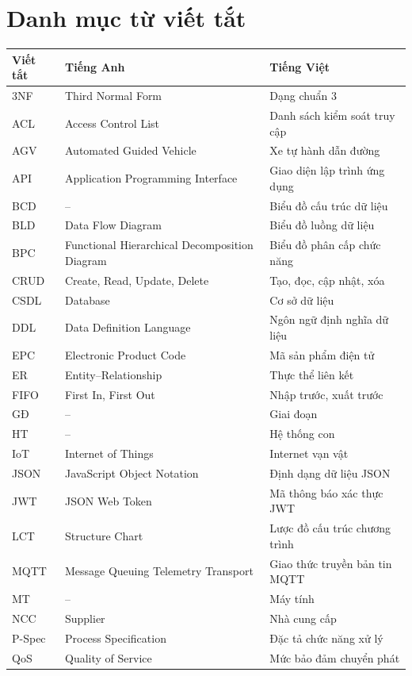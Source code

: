 \chapter*{Danh mục từ viết tắt}
{\small
\begin{longtable}{L{1.9cm} L{6.2cm} p{6.2cm}}
\toprule
\textbf{Viết tắt} & \textbf{Tiếng Anh} & \textbf{Tiếng Việt} \\
\midrule
\endhead
3NF & Third Normal Form & Dạng chuẩn 3 \\
ACL & Access Control List & Danh sách kiểm soát truy cập \\
AGV & Automated Guided Vehicle & Xe tự hành dẫn đường \\
API & Application Programming Interface & Giao diện lập trình ứng dụng \\
BCD & -- & Biểu đồ cấu trúc dữ liệu \\
BLD & Data Flow Diagram & Biểu đồ luồng dữ liệu \\
BPC & Functional Hierarchical Decomposition Diagram & Biểu đồ phân cấp chức năng \\
CRUD & Create, Read, Update, Delete & Tạo, đọc, cập nhật, xóa \\
CSDL & Database & Cơ sở dữ liệu \\
DDL & Data Definition Language & Ngôn ngữ định nghĩa dữ liệu \\
EPC & Electronic Product Code & Mã sản phẩm điện tử \\
ER & Entity--Relationship & Thực thể liên kết \\
FIFO & First In, First Out & Nhập trước, xuất trước \\
GĐ & -- & Giai đoạn \\
HT & -- & Hệ thống con \\
IoT & Internet of Things & Internet vạn vật \\
JSON & JavaScript Object Notation & Định dạng dữ liệu JSON \\
JWT & JSON Web Token & Mã thông báo xác thực JWT \\
LCT & Structure Chart & Lược đồ cấu trúc chương trình \\
MQTT & Message Queuing Telemetry Transport & Giao thức truyền bản tin MQTT \\
MT & -- & Máy tính \\
NCC & Supplier & Nhà cung cấp \\
P-Spec & Process Specification & Đặc tả chức năng xử lý \\
QoS & Quality of Service & Mức bảo đảm chuyển phát \\

\end{longtable}}
